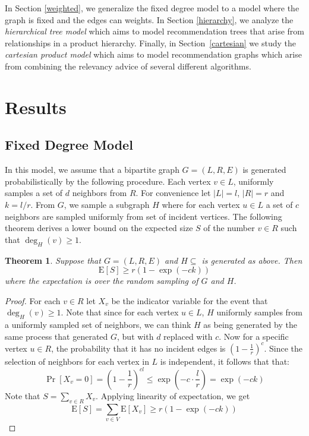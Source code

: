 \documentclass[11pt]{article}
\newcommand{\E}{\text{E}}
\newtheorem{thm}{Theorem}
\begin{document}
In Section \ref{weighted}, we generalize the fixed degree model to a
model where the graph is fixed and the edges can weights. In Section
\ref{hierarchy}, we analyze the {\em hierarchical tree model} which
aims to model recommendation trees that arise from relationships in a
product hierarchy. Finally, in Section~\ref{cartesian} we study the 
{\em cartesian product model} which aims to model recommendation 
graphs which arise from combining the relevancy advice of several 
different algorithms.

\section{Results}
\subsection{Fixed Degree Model}
\label{fixed-degree}

In this model, we assume that a bipartite graph $G=(L,R,E)$ is
generated probabilistically by the following procedure. Each
vertex $v\in L$, uniformly samples a set of $d$ neighbors
from $R$. For convenience let $|L|=l$, $|R|=r$ and $k=l/r$. From
$G$, we sample a subgraph $H$ where for each vertex $u\in L$ a set of
$c$ neighbors are sampled uniformly from set of incident vertices. The
following theorem derives a lower bound on the expected size $S$ of the
number $v\in R$ such that $\deg_H(v) \geq 1$.

\begin{thm}
Suppose that $G=(L,R,E)$ and $H\subseteq$ is generated as above. Then
\[ \E[S] \geq r(1-\exp(-ck))\]
where the expectation is over the random sampling of $G$ and $H$.
\end{thm}
\begin{proof}
For each $v\in R$ let $X_v$ be the indicator variable for the event
that $\deg_H(v) \geq 1$. Note that since for each vertex $u\in L$, $H$
uniformly samples from a uniformly sampled set of neighbors, we can
think $H$ as being generated by the same process that generated $G$,
but with $d$ replaced with $c$. Now for a specific vertex $u \in R$,
the probability that it has no incident edges is 
$\left(1-\frac{1}{r}\right)^c$. Since the selection of neighbors for each 
vertex in $L$ is independent, it follows that that:
\[ \Pr[X_v=0] = \left(1-\frac{1}{r}\right)^{cl} \leq \exp\left(-c \cdot \frac{l}{r}\right) = \exp(-ck) \]
Note that $S = \sum_{v\in R} X_v$. Applying linearity of expectation, we get
\[ \E[S] = \sum_{v\in V} \E[X_v] \geq r(1-\exp(-ck))\]
\end{proof}
\end{document}
